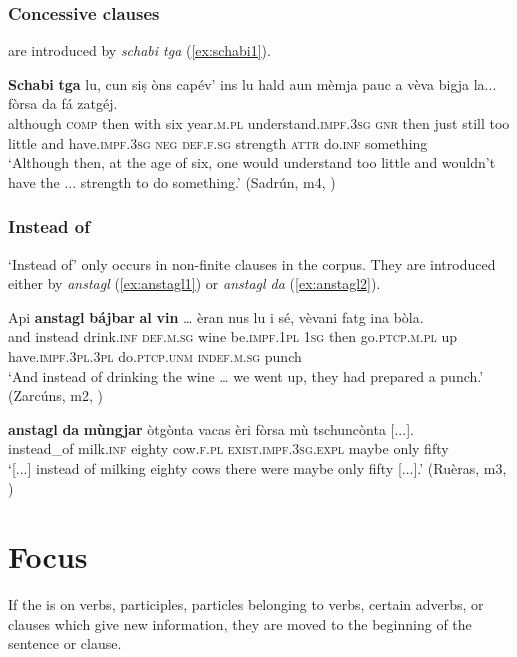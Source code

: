 \subsubsection{Concessive clauses}\label{sec:6.2.2.8}
 are introduced by \textit{schabi tga} (\ref{ex:schabi1}).

\ea
\label{ex:schabi1}
\gll \textbf{Schabi} \textbf{tga} lu, cun siṣ òns capév’ ins lu hald aun mèmja pauc a vèva bigja la... fòrsa da fá zatgéj.   \\
although \textsc{comp} then with six year.\textsc{m.pl} understand.\textsc{impf.3sg} \textsc{gnr} then just still too little and have.\textsc{impf.3sg} \textsc{neg} \textsc{def.f.sg} strength \textsc{attr} do.\textsc{inf} something\\
\glt `Although then, at the age of six, one would understand too little and wouldn’t have the ... strength to do something.' (Sadrún, m4, )
\z

\subsubsection{Instead of}\label{sec:6.2.2.9}
`Instead of' only occurs in non-finite clauses in the corpus. They are introduced either by \textit{anstagl} (\ref{ex:anstagl1}) or \textit{anstagl da} (\ref{ex:anstagl2}).

\ea
\label{ex:anstagl1}
\gll    Api \textbf{anstagl} \textbf{bájbar} \textbf{al} \textbf{vin} … èran nus lu i sé, vèvani fatg ina bòla.\\
and instead drink.\textsc{inf} \textsc{def.m.sg} wine {} be.\textsc{impf.1pl} \textsc{1sg} then go.\textsc{ptcp.m.pl} up have.\textsc{impf.3pl.3pl} do.\textsc{ptcp.unm} \textsc{indef.m.sg} punch \\
\glt `And instead of drinking the wine … we went up, they had prepared a punch.' (Zarcúns, m2, )
\z

\ea
\label{ex:anstagl2}
	\gll [...] \textbf{anstagl} \textbf{da} \textbf{mùngjar} òtgònta vacas èri fòrsa mù tschuncònta [...].\\
 {} instead\_of milk.\textsc{inf} eighty cow.\textsc{f.pl} \textsc{exist.impf.3sg.expl} maybe only fifty\\
\glt `[...]  instead of milking eighty cows there were maybe only fifty [...].' (Ruèras, m3, )
\z



\section{Focus}\label{sec:6.3}
If the  is on verbs, participles, particles belonging to verbs, certain adverbs, or clauses which give new information, they are moved to the beginning of the sentence or clause.

